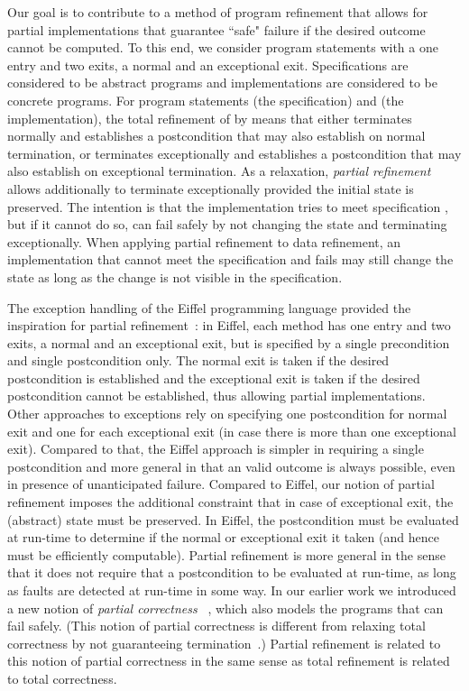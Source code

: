 \documentclass[submission,copyright,creativecommons]{eptcs}
\begin{document}
Our goal is to contribute to a method of program refinement that allows for partial implementations that guarantee ``safe" failure if the desired outcome cannot be computed. To this end, we consider program statements with a one entry and two exits, a normal and an exceptional exit. Specifications are considered to be abstract programs and implementations are  considered to be concrete programs. For program statements  (the specification) and  (the implementation), the total refinement of  by  means that either  terminates normally and establishes a postcondition that  may also establish on normal termination, or  terminates exceptionally and establishes a postcondition that  may also establish on exceptional termination. As a relaxation, {\em partial refinement} allows  additionally to terminate exceptionally provided the initial state is preserved. The intention is that the implementation  tries to meet specification , but if it cannot do so,  can fail safely by not changing the state and terminating exceptionally. When applying partial refinement to data refinement, an implementation that cannot meet the specification and fails may still change the state as long as the change is not visible in the specification.



The exception handling of the Eiffel programming language provided the inspiration for partial refinement~\cite{Meyer97OOSoftwareConstruction}: in Eiffel, each method has one entry and two exits, a normal and an exceptional exit, but is specified by a single precondition and single postcondition only. The normal exit is taken if the desired postcondition is established and the exceptional exit is taken if the desired postcondition cannot be established, thus allowing partial implementations. Other approaches to  exceptions rely on specifying one postcondition for normal exit and one for each exceptional exit (in case there is more than one exceptional exit). Compared to that, the Eiffel approach is simpler in requiring a single postcondition and more general in that an valid outcome is always possible, even in presence of unanticipated failure. Compared to Eiffel, our notion of partial refinement imposes the additional constraint that in case of exceptional exit, the (abstract) state must be preserved. In Eiffel, the postcondition must be evaluated at run-time to determine if the normal or exceptional exit it taken (and hence must be efficiently computable). Partial refinement is more general  in the sense that it does not require that a postcondition to be evaluated at run-time, as long as faults are detected at run-time in some way. In our earlier work we introduced a new notion of {\em partial correctness}
~\cite{SekerinskiZhang11PartialCorrectness}, which also models the programs that can fail safely. (This notion of partial correctness is different from relaxing total correctness by not guaranteeing termination~\cite{JacobsGries85GeneralCorrectness}.) Partial refinement is related to this notion of partial correctness in the same sense as total refinement is related to total correctness.
\end{document}
